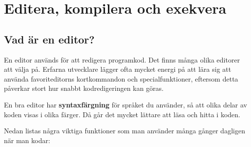 
\chapter{Editera, kompilera och exekvera}\label{appendix:compile}

\section{Vad är en editor?}

En editor används för att redigera programkod. Det finns många olika editorer att välja på. Erfarna utvecklare lägger ofta mycket energi på att lära sig att använda favoriteditorns kortkommandon och specialfunktioner, eftersom detta påverkar stort hur snabbt kodredigeringen kan göras. 

En bra editor har \textbf{syntaxfärgning} för språket du använder, så att olika delar av koden visas i olika färger. Då går det mycket lättare att läsa och hitta i koden. 

Nedan listas några viktiga funktioner som man använder många gånger dagligen när man kodar:

